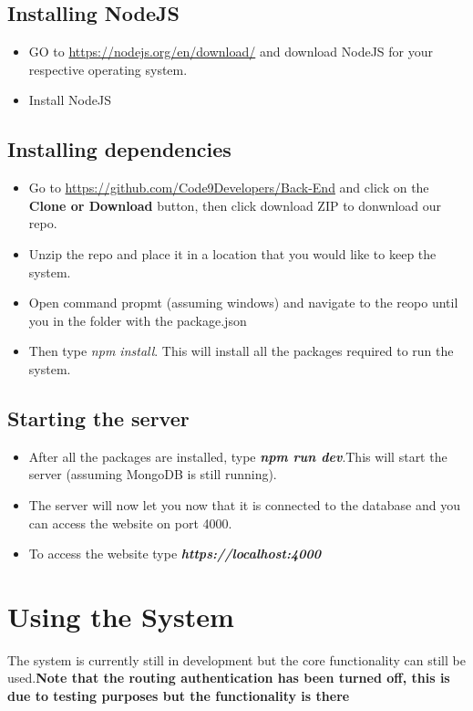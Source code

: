 \documentclass[a4paper,12pt]{article}
\begin{document}
\newpage
\subsection{Installing NodeJS}
\begin{itemize}
	\item GO to \url{https://nodejs.org/en/download/} and download NodeJS for your respective operating system.
	\item Install NodeJS
\end{itemize}

	\subsection{Installing dependencies}
		\begin{itemize}
			\item Go to \url{https://github.com/Code9Developers/Back-End} and click on the\textbf{ Clone or Download } button, then click download ZIP to donwnload our repo.
			
			\item Unzip the repo and place it in a location that you would like to keep the system.
			
			\item Open command propmt (assuming windows) and navigate to the reopo until you in the folder with the package.json
			
			\item Then type \textit{npm install}. This will install all the packages required to run the system.
		\end{itemize}
		\subsection{Starting the server}
			\begin{itemize}
			\item After all the packages are installed, type \textbf{\textit{npm run dev}}.This will start the server (assuming MongoDB is still running).
			
			\item The server will now let you now that it is connected to the database and you can access the website on port 4000.
			
			\item To access the website type \textbf{\textit{https://localhost:4000}}
		\end{itemize}
\newpage

\section{Using the System}
The system is currently still in development but the core functionality can still be used.\textbf{Note that the routing authentication has been turned off, this is due to testing purposes but the functionality is there}
\end{document}
